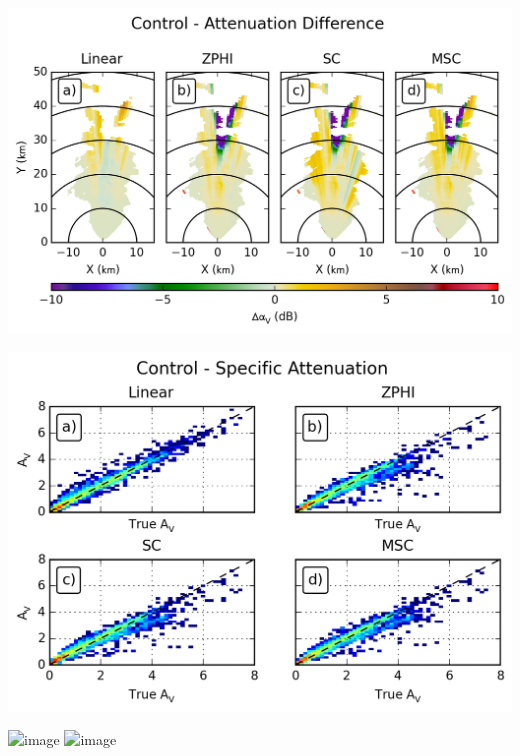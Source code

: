 \documentclass[red]{beamer}
\begin{document}
\begin{frame}
    \begin{center}
        \includegraphics[scale=0.7]{figures/spatial/X_Control_Attenuation_Difference_V}
    \end{center}
\end{frame}

\begin{frame}
    \begin{center}
        \includegraphics[scale=0.7]{figures/spatial/X_Control_Specific_Attenuation_V_scatter}
    \end{center}
\end{frame}

\begin{frame}
    \begin{center}
        \includegraphics<1>[scale=0.7]{figures/spatial/C_Sidelobe_Attenuation_V}
        \includegraphics<2>[scale=0.7]{figures/spatial/C_Control_Attenuation_V}
    \end{center}
\end{frame}
\end{document}

